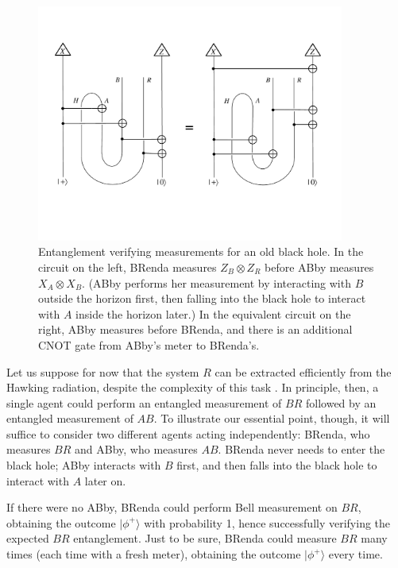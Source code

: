 \documentclass[11pt]{article}
\begin{document}
\begin{figure}[t]
\begin{center}
\includegraphics[width=0.9\textwidth]{brenda-first.pdf}
\end{center}
\caption{Entanglement verifying measurements for an old black hole. In the circuit on the left, BRenda measures $Z_B\otimes Z_R$ before ABby measures $X_A\otimes X_B$. (ABby performs her measurement by interacting with $B$ outside the horizon first, then falling into the black hole to interact with $A$ inside the horizon later.) In the equivalent circuit on the right, ABby measures before BRenda, and there is an additional CNOT gate from ABby's meter to BRenda's.}
\label{fig:brenda-first}
\end{figure}

Let us suppose for now that the system $R$ can be extracted efficiently from the Hawking radiation, despite the complexity of this task  \cite{harlow-hayden}. In principle, then, a single agent could perform an entangled measurement of $BR$ followed by an entangled measurement of $AB$. To illustrate our essential point, though, it will suffice to consider two different agents acting independently: BRenda, who measures $BR$ and ABby, who measures $AB$. BRenda never needs to enter the black hole; ABby interacts with $B$ first, and then falls into the black hole to interact with $A$ later on.

If there were no ABby, BRenda could perform Bell measurement on $BR$, obtaining the outcome $|\phi^+\rangle$ with probability 1, hence successfully verifying the expected $BR$ entanglement. Just to be sure, BRenda could measure $BR$ many times (each time with a fresh meter), obtaining the outcome $|\phi^+\rangle$ every time.
\end{document}
